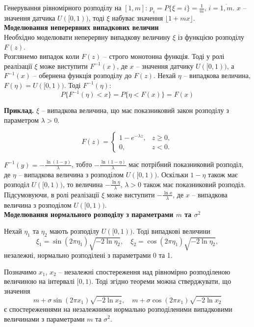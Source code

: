 Генерування рівномірного розподілу на $[1, m]$: $p_i = P \{ \xi = i \} = \frac{1}{m}$, $i = \overline{1,m}$. $x$ -- значення датчика $U([0,1))$, тоді $\xi$ набуває значення $\lfloor 1 + m x \rfloor$. \\

\textbf{Моделювання неперервних випадкових величин} \\

Необхідно моделювати неперервну випадкову величину $\xi$ із функцією розподілу $F(z)$. \\

Розглянемо випадок коли $F(z)$ -- строго монотонна функція. Тоді у ролі реалізації $\xi$ може виступити $F^{-1}(x)$, де $x$ -- значення датчику $U([0,1))$, а $F^{-1}(x)$ -- обернена функція розподілу до $F(z)$. Нехай $\eta$ -- випадкова величина, $F(\eta) = U([0, 1))$. Тоді $F^{-1}(\eta)$:
\[ P\{ F^{-1}(\eta) < x \} = P \{ \eta < F(x) \} = F(x) \]

\textbf{Приклад.} $\xi$ -- випадкова величина, що має показниковий закон розподілу з параметром $\lambda > 0$.

\[ F(z) = \begin{cases} 1 - e^{-\lambda z}, & z \ge 0, \\ 0, & z < 0. \end{cases} \]

$F^{-1}(y) = - \frac{\ln(1-y)}{\lambda}$, тобто $- \frac{\ln(1 - \eta)}{\lambda}$ має потрібний показниковий розподіл, де $\eta$ -- випадкова величина з розподілом $U([0,1))$. Оскільки $1 - \eta$ також має розподіл $U([0,1))$, то величина $-\frac{\ln \eta}{\lambda}$, $\lambda > 0$ також має показниковий розподіл. Підсумовуючи, в ролі реалізації $\xi$ може виступити $-\frac{\ln x}{\lambda}$, де $x$ -- випадкова величина з розподілом $U([0,1))$. \\

\textbf{Моделювання нормального розподілу з параметрами $m$ та $\sigma^2$} 

\begin{theorem}
    Нехай $\eta_1$ та $\eta_2$ мають розподілу $U([0,1))$. Тоді випадкові величини
    \[ \xi_1 = \sin(2 \pi \eta_1) \sqrt{-2 \ln \eta_2}, \quad \xi_2 = \cos(2 \pi \eta_1) \sqrt{-2 \ln \eta_2}, \]
    незалежні, нормально розподілені з параметрами 0 та 1.
\end{theorem}

Позначимо $x_1$, $x_2$ -- незалежні спостереження над рівномірно розподіленою величиною на інтервалі $[0, 1)$. Тоді згідно теореми можна стверджувати, що значення 
\[ m + \sigma \sin (2 \pi x_1) \sqrt{- 2 \ln x_2}, \quad m + \sigma \cos (2 \pi x_1) \sqrt{- 2 \ln x_2} \]
є спостереженнями на незалежними нормально розподіленими випадковими величинами з параметрами $m$ та $\sigma^2$. \\

